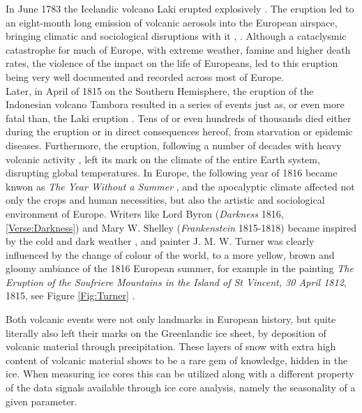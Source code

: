 \documentclass[../../CompleteThesis2/Complete_2ndDraft]{subfiles}
\begin{document}
In June 1783 the Icelandic volcano Laki erupted explosively \cite[J. Steingrímsson, 1998]{Steingrimsson1998}. The eruption led to an eight-month long emission of volcanic aerosols into the European airspace, bringing climatic and sociological disruptions with it \cite[R. Stone, 2004]{Stone2004}, \cite[T. Thordaldson and S. Self, 2004]{Thordaldson2004}. Although a cataclysmic catastrophe for much of Europe, with extreme weather, famine and higher death rates, the violence of the impact on the life of Europeans, led to this eruption being very well documented and recorded across most of Europe. \\
Later, in April of 1815 on the Southern Hemisphere, the eruption of the Indonesian volcano Tambora resulted in a series of events just as, or even more fatal than, the Laki eruption \cite[C. Oppenheimer, 2003]{Oppenheimer2003}. Tens of or even hundreds of thousands died either during the eruption or in direct consequences hereof, from starvation or epidemic diseases. Furthermore, the eruption, following a number of decades with heavy volcanic activity \cite[J. Cole-Dai et al., 2009]{Dai2009}, left its mark on the climate of the entire Earth system, disrupting global temperatures. In Europe, the following year of 1816 became knwon as \textit{The Year Without a Summer} \cite{Oppenheimer2003}, and the apocalyptic climate affected not only the crops and human necessities, but also the artistic and sociological environment of Europe. Writers like Lord Byron (\textit{Darkness} 1816, \ref{Verse:Darkness}) and Mary W. Shelley (\textit{Frankenstein} 1815-1818) became inspired by the cold and dark weather \cite[A. Marshall, 2020]{Marshall2020}, and painter J. M. W. Turner was clearly influenced by the change of colour of the world, to a more yellow, brown and gloomy ambiance of the 1816 European summer, for example in the painting \textit{The Eruption of the Soufriere Mountains in the Island of St Vincent, 30 April 1812}, 1815, see Figure \ref{Fig:Turner} \cite[C. Zerefos, 2007]{Zerefos2007}.

Both volcanic events were not only landmarks in European history, but quite literally also left their marks on the Greenlandic ice sheet, by deposition of volcanic material through precipitation. These layers of snow with extra high content of volcanic material shows to be a rare gem of knowledge, hidden in the ice. When measuring ice cores this can be utilized along with a different property of the data signals available through ice core analysis, namely the seasonality of a given parameter.
\end{document}
